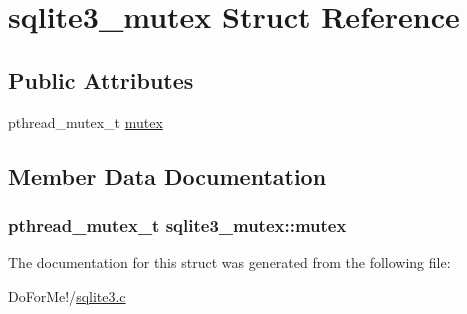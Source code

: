 \hypertarget{structsqlite3__mutex}{\section{sqlite3\-\_\-mutex Struct Reference}
\label{structsqlite3__mutex}
}
\subsection*{Public Attributes}
\begin{DoxyCompactItemize}
\item 
pthread\-\_\-mutex\-\_\-t \hyperlink{structsqlite3__mutex_a6eef25bee73a3640dbbd052d707dbfdc}{mutex}
\end{DoxyCompactItemize}


\subsection{Member Data Documentation}
\hypertarget{structsqlite3__mutex_a6eef25bee73a3640dbbd052d707dbfdc}{
\subsubsection[{mutex}]{\setlength{\rightskip}{0pt plus 5cm}pthread\-\_\-mutex\-\_\-t sqlite3\-\_\-mutex\-::mutex}}\label{structsqlite3__mutex_a6eef25bee73a3640dbbd052d707dbfdc}


The documentation for this struct was generated from the following file\-:\begin{DoxyCompactItemize}
\item 
Do\-For\-Me!/\hyperlink{sqlite3_8c}{sqlite3.\-c}\end{DoxyCompactItemize}

